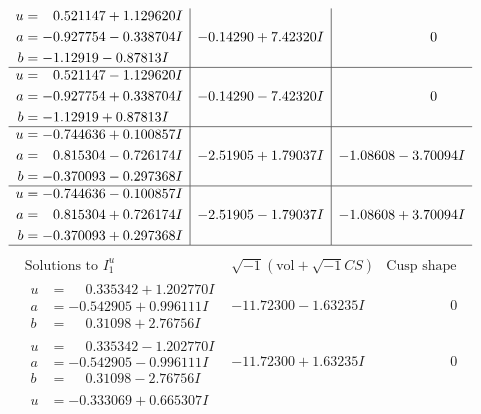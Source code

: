 \documentclass[1p]{elsarticle_modified}
\theoremstyle{definition}
\newcommand{\I}{\sqrt{-1}}
\begin{document}
$$\begin{array}{c|c|c}
\begin{aligned}
u &= \phantom{-}0.521147 + 1.129620 I \\
a &= -0.927754 - 0.338704 I \\
b &= -1.12919 - 0.87813 I\end{aligned}
 & -0.14290 + 7.42320 I & \phantom{-0.000000 } 0 \\ \hline\begin{aligned}
u &= \phantom{-}0.521147 - 1.129620 I \\
a &= -0.927754 + 0.338704 I \\
b &= -1.12919 + 0.87813 I\end{aligned}
 & -0.14290 - 7.42320 I & \phantom{-0.000000 } 0 \\ \hline\begin{aligned}
u &= -0.744636 + 0.100857 I \\
a &= \phantom{-}0.815304 - 0.726174 I \\
b &= -0.370093 - 0.297368 I\end{aligned}
 & -2.51905 + 1.79037 I & -1.08608 - 3.70094 I \\ \hline\begin{aligned}
u &= -0.744636 - 0.100857 I \\
a &= \phantom{-}0.815304 + 0.726174 I \\
b &= -0.370093 + 0.297368 I\end{aligned}
 & -2.51905 - 1.79037 I & -1.08608 + 3.70094 I\\
 \hline 
 \end{array}$$\newpage$$\begin{array}{c|c|c}  
\text{Solutions to }I^u_{1}& \I (\text{vol} + \sqrt{-1}CS) & \text{Cusp shape}\\
 \hline 
\begin{aligned}
u &= \phantom{-}0.335342 + 1.202770 I \\
a &= -0.542905 + 0.996111 I \\
b &= \phantom{-}0.31098 + 2.76756 I\end{aligned}
 & -11.72300 - 1.63235 I & \phantom{-0.000000 } 0 \\ \hline\begin{aligned}
u &= \phantom{-}0.335342 - 1.202770 I \\
a &= -0.542905 - 0.996111 I \\
b &= \phantom{-}0.31098 - 2.76756 I\end{aligned}
 & -11.72300 + 1.63235 I & \phantom{-0.000000 } 0 \\ \hline\begin{aligned}
u &= -0.333069 + 0.665307 I \\

\end{aligned}
\end{array}$$
\end{document}
